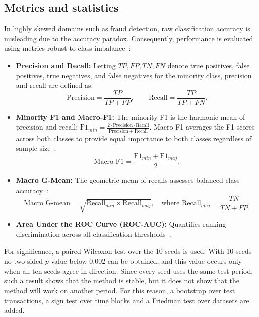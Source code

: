\documentclass[preprint,10pt]{elsarticle}
\let\OldSubsection\subsection
\renewcommand{\subsection}{\OldSubsection}
\begin{document}
\subsection{Metrics and statistics}
In highly skewed domains such as fraud detection, raw classification accuracy is misleading due to the accuracy paradox. Consequently, performance is evaluated using metrics robust to class imbalance~\cite{he2009}:
\begin{itemize}[leftmargin=1.5em]
\item \textbf{Precision and Recall:} Letting $TP, FP, TN, FN$ denote true positives, false positives, true negatives, and false negatives for the minority class, precision and recall are defined as:
\begin{equation}
\mathrm{Precision} = \frac{TP}{TP + FP}, \qquad \mathrm{Recall} = \frac{TP}{TP + FN}.
\end{equation}
\item \textbf{Minority F1 and Macro-F1:} The minority F1 is the harmonic mean of precision and recall: $\mathrm{F1}_{min} = \frac{2 \cdot \mathrm{Precision} \cdot \mathrm{Recall}}{\mathrm{Precision} + \mathrm{Recall}}$. Macro-F1 averages the F1 scores across both classes to provide equal importance to both classes regardless of sample size~\cite{santos2022}:
\begin{equation}
\text{Macro-F1} = \frac{\mathrm{F1}_{min} + \mathrm{F1}_{maj}}{2}.
\end{equation}
\item \textbf{Macro G-Mean:} The geometric mean of recalls assesses balanced class accuracy~\cite{kubat1997}:
\begin{equation}
\text{Macro G-mean} = \sqrt{\mathrm{Recall}_{min} \times \mathrm{Recall}_{maj}}, \quad \text{where } \mathrm{Recall}_{maj} = \frac{TN}{TN + FP}.
\end{equation}
\item \textbf{Area Under the ROC Curve (ROC-AUC):} Quantifies ranking discrimination across all classification thresholds~\cite{fawcett2006}.
\end{itemize}

For significance, a paired Wilcoxon test over the 10 seeds is used. With 10 seeds no two-sided $p$-value below 0.002 can be obtained, and this value occurs only when all ten seeds agree in direction. Since every seed uses the same test period, such a result shows that the method is stable, but it does not show that the method will work on another period. For this reason, a bootstrap over test transactions, a sign test over time blocks and a Friedman test over datasets are added.
\end{document}
